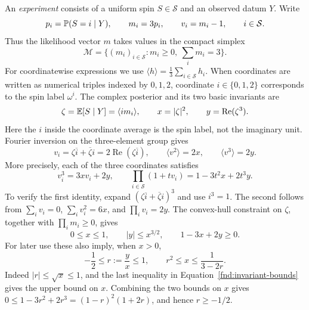 An \emph{experiment} consists of a uniform spin \(S\in\mathcal S\) and
an observed datum \(Y\).  Write
\begin{equation}\label{fnd:posterior}
 p_i=\mathbb P(S=i\mid Y),\qquad m_i=3p_i,\qquad v_i=m_i-1,
 \qquad i\in\mathcal S.
\end{equation}
Thus the likelihood vector \(m\) takes values in the compact simplex
\[
 \mathcal M=\{(m_i)_{i\in\mathcal S}:m_i\geq0,\ \textstyle\sum_i m_i=3\}.
\]
For coordinatewise expressions we use
\(\langle h\rangle=\frac13\sum_{i\in\mathcal S}h_i\).
When coordinates are written as numerical triples indexed by $0,1,2$,
coordinate $i\in\{0,1,2\}$ corresponds to the spin label $\omega^i$.
The complex posterior and its two basic invariants are
\begin{equation}\label{fnd:complex}
 \zeta=\mathbb E[S\mid Y]=\langle i m_i\rangle,\qquad
 x=|\zeta|^2,\qquad y=\operatorname{Re}(\zeta^3).
\end{equation}
Here the \(i\) inside the coordinate average is the spin label, not the
imaginary unit.  Fourier inversion on the three-element group gives
\begin{equation}\label{fnd:fourier}
 v_i=\zeta\overline{i}+\overline{\zeta}i
     =2\operatorname{Re}(\zeta\overline{i}),\qquad
 \langle v^2\rangle=2x,\qquad \langle v^3\rangle=2y.
\end{equation}
More precisely, each of the three coordinates satisfies
\begin{equation}\label{fnd:cubic}
 v_i^3=3xv_i+2y,\qquad
 \prod_{i\in\mathcal S}(1+t v_i)=1-3t^2x+2t^3y.
\end{equation}
To verify the first identity, expand
\((\zeta\overline{i}+\overline{\zeta}i)^3\) and use \(i^3=1\).
The second follows from \(\sum_i v_i=0\),
\(\sum_i v_i^2=6x\), and \(\prod_i v_i=2y\).
The convex-hull constraint on \(\zeta\), together with
\(\prod_i m_i\geq0\), gives
\begin{equation}\label{fnd:invariant-bounds}
 0\leq x\leq1,\qquad |y|\leq x^{3/2},\qquad 1-3x+2y\geq0.
\end{equation}
For later use these also imply, when \(x>0\),
\begin{equation}\label{fnd:ratio-domain}
 -\frac12\leq r:=\frac yx\leq1,\qquad
 r^2\leq x\leq\frac1{3-2r}.
\end{equation}
Indeed \(|r|\leq\sqrt{x}\leq1\), and the last inequality in
Equation~\eqref{fnd:invariant-bounds} gives the upper bound on \(x\).
Combining the two bounds on \(x\) gives
\(0\leq1-3r^2+2r^3=(1-r)^2(1+2r)\), and hence \(r\geq-1/2\).

